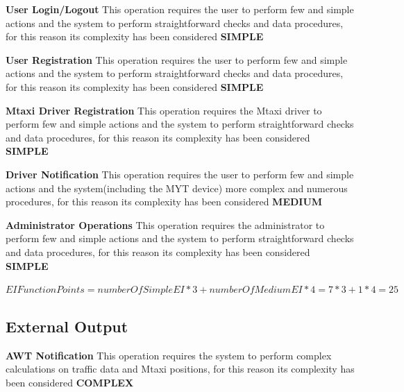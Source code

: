 \documentclass[11pt,titlepage]{article} %
\begin{document}
      \noindent \textbf{User Login/Logout}\newline
      This operation requires the user to perform few and simple actions and the system to perform straightforward checks and data procedures,
      for this reason its complexity has been considered \textbf{SIMPLE}\newline\newline
      
      \noindent \textbf{User Registration}\newline
      This operation requires the user to perform few and simple actions and the system to perform straightforward checks and data procedures,
      for this reason its complexity has been considered \textbf{SIMPLE}\newline\newline
      
      \noindent \textbf{Mtaxi Driver Registration}\newline
      This operation requires the Mtaxi driver to perform few and simple actions and the system to perform straightforward checks and data procedures,
      for this reason its complexity has been considered \textbf{SIMPLE}\newline\newline
      
      \noindent \textbf{Driver Notification}\newline
      This operation requires the user to perform few and simple actions and the system(including the MYT device) more complex and numerous procedures,
      for this reason its complexity has been considered \textbf{MEDIUM}\newline\newline
      
      \noindent \textbf{Administrator Operations}\newline
      This operation requires the administrator to perform few and simple actions and the system to perform straightforward checks and data procedures,
      for this reason its complexity has been considered \textbf{SIMPLE}\newline
      
      \begin{center}
	$ EI Function Points = numberOfSimpleEI * 3 + numberOfMediumEI * 4 = 7 * 3 + 1 * 4 = 25 $
      \end{center}
    
    \subsection{External Output}
      \textbf{AWT Notification}\newline
      This operation requires the system to perform complex calculations on traffic data and Mtaxi positions, for this reason its complexity has been considered \textbf{COMPLEX}\newline\newline
\end{document}
